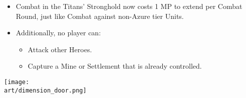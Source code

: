 \begin{multicols*}{2}
\begin{itemize}
  \item Combat in the Titans' Stronghold now costs 1 MP to extend per Combat Round, just like Combat against non-Azure tier Units.
  \item Additionally, no player can:
  \begin{itemize}
    \item Attack other Heroes.
    \item Capture a Mine or Settlement that is already controlled.
  \end{itemize}
\end{itemize}

\vspace*{\fill}

\begin{center}
  \texttt{[image: \\art/dimension\_door.png]}
\end{center}

\vspace*{\fill}

\end{multicols*}

\newpage

